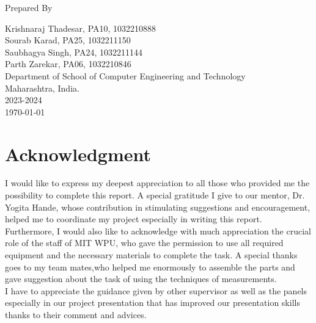 \documentclass[openany]{report}
\begin{document}
\begin{titlepage}
    Prepared By
    \vspace{0.5\baselineskip} %

    \Large{
        Krishnaraj Thadesar, PA10, 1032210888\\
        Sourab Karad, PA25, 1032211150\\
        Saubhagya Singh, PA24, 1032211144\\
        Parth Zarekar, PA06, 1032210846\\
    }
    \vspace{0.5\baselineskip} %
    \LARGE{
        Department of School of Computer Engineering and Technology\\
        Maharashtra, India.\\
        2023-2024\\
    }
    \today

\end{titlepage}


\tableofcontents
\thispagestyle{empty}
\clearpage

\chapter*{Acknowledgment}
\thispagestyle{empty}

I would like to express my deepest appreciation to all those who provided me the possibility to complete this report. A special gratitude I give to our mentor, Dr. Yogita Hande, whose contribution in stimulating suggestions and encouragement, helped me to coordinate my project especially in writing this report.\\

Furthermore, I would also like to acknowledge with much appreciation the crucial role of the staff of MIT WPU, who gave the permission to use all required equipment and the necessary materials to complete the task. A special thanks goes to my team mates,who helped me enormously to assemble the parts and gave suggestion about the task of using the techniques of measurements.\\

I have to appreciate the guidance given by other supervisor as well as the panels especially in our project presentation that has improved our presentation skills thanks to their comment and advices.\\
\end{document}
